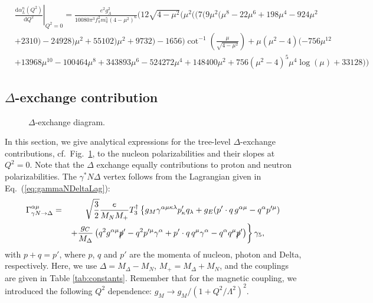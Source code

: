 \documentclass[11pt,preprint,tightenlines,
showpacs,preprintnumbers,amsmath,amssymb,superscriptaddress,a4paper,nofootinbib]{revtex4-1}
\def\bea{\begin{eqnarray}}
\def\eea{\end{eqnarray}}
\def\seclab#1{\label{sec:#1}}
\def\Eqref#1{Eq.~(\ref{eq:#1})}
\def\al{\alpha}
\def\nn{\nonumber}
\def\dd{\mathrm{d}}
\begin{document}
\begin{align}
&\left.\frac{\dd\alpha_{L}^n (Q^2)}{\dd Q^2}\right|_{Q^2=0}=\frac{e^2 g_A^2}{10080 \pi ^3 f_\pi^2 m_\pi^5 (4-\mu ^2)^6
   } (12 \sqrt{4-\mu ^2} (\mu ^2 ((7 (9 \mu ^2 (\mu ^8-22 \mu ^6+198 \mu ^4-924 \mu
   ^2 \nonumber \\ 
&  +2310)-24928) \mu ^2 +55102) \mu ^2+9732)-1656) \cot ^{-1}(\frac{\mu }{\sqrt{4-\mu
   ^2}})+\mu  (\mu ^2-4) (-756 \mu ^{12}  \nonumber \\
&  + 13968 \mu ^{10}-100464 \mu ^8+343893 \mu ^6 -524272 \mu ^4+148400 \mu
   ^2+756 (\mu ^2-4)^5 \mu ^4 \log (\mu )+33128))
\end{align}




\subsection{ $\Delta$-exchange contribution}\seclab{DeltaTreePolarizabilities}

\begin{figure}[hbt]
\centering
{}
\caption{$\Delta$-exchange diagram. \label{DeltaExchange}}
\end{figure}

In this section, we give analytical expressions for the  tree-level $\Delta$-exchange contributions, cf.\ Fig.~\ref{DeltaExchange}, to the nucleon polarizabilities and their slopes at $Q^2=0$. Note that the $\Delta$ exchange equally contributions to proton and neutron polarizabilities. The $\gamma^* N \Delta$ vertex follows from the Lagrangian given in \Eqref{gammaNDeltaLag}:
\bea
\Gamma_{\gamma N \rightarrow \Delta}^{\al \mu}&=&\sqrt{\frac{3}{2}}\frac{e}{M_N M_+}T_3^\dagger\left\{g_M \gamma^{\al \mu \kappa \lambda}p'_\kappa q_\lambda+g_E (p'\cdot q\, g^{\al \mu}-q^\al p^{\prime\mu})\right.\\
&&\left.+\frac{g_C}{M_\Delta} \left(q^2 g^{ \al \mu}\slashed{p}'-q^2 p^{\prime\mu} \gamma^\al +p'\cdot q \,q^\mu \gamma^\al-q^\al q^\mu \slashed{p}'\right)\right\}\gamma_5,\qquad\nn
\eea
with $p+q=p'$, where $p$, $q$ and $p'$ are the momenta of nucleon, photon and Delta, respectively. Here, we use $\varDelta = M_\Delta - M_N$, $M_+=M_\Delta+M_N$, and the couplings are given in Table \ref{tab:constants}.  Remember that for the magnetic coupling, we introduced the following $Q^2$ dependence: $g_M \rightarrow g_M/(1+Q^2/\Lambda^2)^2$.
\end{document}
